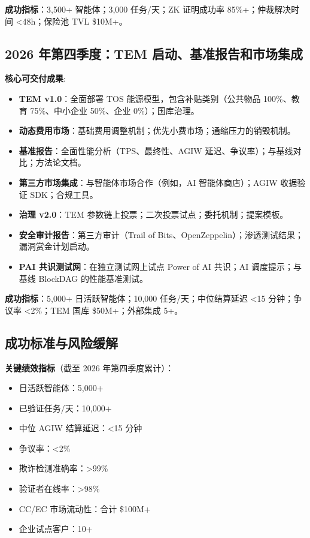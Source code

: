 \documentclass[11pt]{article}
\begin{document}
\textbf{成功指标}：3,500+ 智能体；3,000 任务/天；ZK 证明成功率 85\%+；仲裁解决时间 <48h；保险池 TVL \$10M+。

\subsection{2026 年第四季度：TEM 启动、基准报告和市场集成}

\textbf{核心可交付成果}:
\begin{itemize}[noitemsep]
  \item \textbf{TEM v1.0}：全面部署 TOS 能源模型，包含补贴类别（公共物品 100\%、教育 75\%、中小企业 50\%、企业 0\%）；国库治理。
  \item \textbf{动态费用市场}：基础费用调整机制；优先小费市场；通缩压力的销毁机制。
  \item \textbf{基准报告}：全面性能分析（TPS、最终性、AGIW 延迟、争议率）；与基线对比；方法论文档。
  \item \textbf{第三方市场集成}：与智能体市场合作（例如，AI 智能体商店）；AGIW 收据验证 SDK；合规工具。
  \item \textbf{治理 v2.0}：TEM 参数链上投票；二次投票试点；委托机制；提案模板。
  \item \textbf{安全审计报告}：第三方审计（Trail of Bits、OpenZeppelin）；渗透测试结果；漏洞赏金计划启动。
  \item \textbf{PAI 共识测试网}：在独立测试网上试点 Power of AI 共识；AI 调度提示；与基线 BlockDAG 的性能基准测试。
\end{itemize}

\textbf{成功指标}：5,000+ 日活跃智能体；10,000 任务/天；中位结算延迟 <15 分钟；争议率 <2\%；TEM 国库 \$50M+；外部集成 5+。

\subsection{成功标准与风险缓解}

\textbf{关键绩效指标}（截至 2026 年第四季度累计）：
\begin{itemize}[noitemsep]
  \item 日活跃智能体：5,000+
  \item 已验证任务/天：10,000+
  \item 中位 AGIW 结算延迟：<15 分钟
  \item 争议率：<2\%
  \item 欺诈检测准确率：>99\%
  \item 验证者在线率：>98\%
  \item CC/EC 市场流动性：合计 \$100M+
  \item 企业试点客户：10+
\end{itemize}
\end{document}
